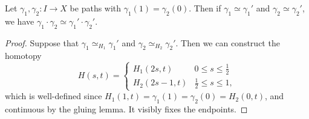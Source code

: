 \documentclass[a4paper]{scrartcl}
\begin{document}
\begin{lemma} \label{lem:concat-well-defined}
	Let $\gamma_1, \gamma_2: I \rightarrow X$ be paths with $\gamma_1(1) = \gamma_2(0)$. Then if $\gamma_1 \simeq \gamma_1'$ and $\gamma_2 \simeq \gamma_2'$, we have $\gamma_1 \cdot \gamma_2 \simeq \gamma_1' \cdot \gamma_2'$.
\end{lemma}
\begin{proof}
	Suppose that $\gamma_1 \simeq_{H_1} \gamma_1'$ and $\gamma_2 \simeq_{H_2} \gamma_2'$. Then we can construct the homotopy
	$$
	H(s, t)= \begin{cases}H_1(2 s, t) & 0 \leq s \leq \frac{1}{2} \\ H_2(2 s-1, t) & \frac{1}{2} \leq s \leq 1,\end{cases}
	$$
	which is well-defined since $H_1(1,t) = \gamma_1(1) = \gamma_2(0) = H_2(0,t)$, and continuous by the gluing lemma. It visibly fixes the endpoints.
\end{proof}
\end{document}
